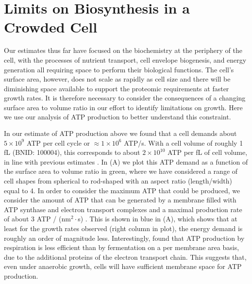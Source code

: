 \section{Limits on Biosynthesis in a Crowded Cell}
Our estimates thus far have focused on the biochemistry at the periphery of the
cell, with the processes of nutrient transport, cell envelope biogenesis, and
energy generation all requiring space to perform their biological functions. The
cell's surface area, however, does not scale as rapidly as cell size
\citep{harris2018} and there will be diminishing space available to support the
proteomic requirements at faster growth rates. It is therefore  necessary to
consider the consequences of a changing surface area to volume ratio in our effort to identify
limitations on growth. Here we use our analysis of ATP production to
better understand this constraint.

In our estimate of ATP production above we found that a cell demands about $5
\times 10^9$ ATP per cell cycle or $\approx 1 \times 10^6$ ATP/s. With a cell volume of roughly 1
fL (BNID: 100004), this corresponds to about $2 \times 10^{10}$ ATP per fL of
cell volume, in line with previous estimates \citep{stouthamer1977, szenk2017}.
In  (A) we plot this ATP demand as a function of the surface area to volume
ratio in green, where we have considered a range of cell shapes from spherical
to rod-shaped with an aspect ratio (length/width) equal to 4. In order to
consider the maximum ATP that could be produced, we consider the amount of ATP
that can be generated by a membrane filled with ATP synthase and electron
transport complexes and a maximal production rate of about 3 ATP / (nm$^2
\cdot$s) \citep{szenk2017}. This is shown in blue in (A),
which shows that at least for the growth rates observed (right column in plot),
the energy demand is roughly an order of magnitude less. Interestingly,
\cite{szenk2017} found that ATP production by respiration is less efficient than
by fermentation on a per membrane area basis, due to the additional proteins of
the electron transport chain. This suggests that, even under anaerobic growth,
cells will have sufficient membrane space for ATP production.

